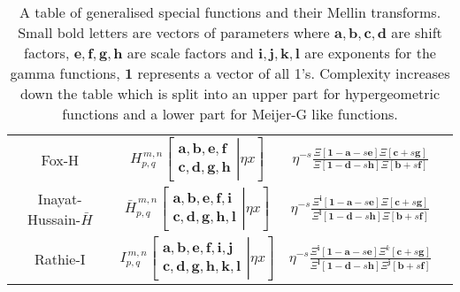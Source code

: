 \documentclass[journal=jcisd8,manuscript=article,layout=onecolumn,pdftex,floatfix,amsmath,amssymb,10pt]{achemso}
\begin{document}
\begin{table}
\begin{tabular}{|c|c|c|c|}
Fox-H & $H_{p,q}^{\,m,n} \!\left[\left. \begin{matrix}
\mathbf{a},\mathbf{b},\mathbf{e,f} \\
\mathbf{c},\mathbf{d},\mathbf{g,h} \end{matrix} \right| \eta x \right]$ & $\eta^{-s}\frac{\Xi[\mathbf{1-a}-s\mathbf{e}]\Xi[\mathbf{c}+s\mathbf{g}]}{\Xi[\mathbf{1-d}-s\mathbf{h}] \Xi[\mathbf{b} + s \mathbf{f}]}$ & \citep{Fox1961,Rathie2017}\\
Inayat-Hussain-$\bar{H}$  & $\bar{H}_{p,q}^{\,m,n} \!\left[\left. \begin{matrix}
\mathbf{a},\mathbf{b},\mathbf{e,f,i} \\
\mathbf{c},\mathbf{d},\mathbf{g,h,l} \end{matrix} \right| \eta x \right]$ & $\eta^{-s}\frac{\Xi^{\mathbf{i}}[\mathbf{1-a}-s\mathbf{e}]\Xi[\mathbf{c}+s\mathbf{g}]}{\Xi^{\mathbf{l}}[\mathbf{1-d}-s\mathbf{h}] \Xi[\mathbf{b} + s \mathbf{f}]}$ & \citep{InayatHussain}\\
Rathie-I & $I_{p,q}^{\,m,n} \!\left[\left. \begin{matrix}
\mathbf{a},\mathbf{b},\mathbf{e,f,i,j} \\
\mathbf{c},\mathbf{d},\mathbf{g,h,k,l} \end{matrix} \right| \eta x \right]$ & $\eta^{-s}\frac{\Xi^{\mathbf{i}}[\mathbf{1-a}-s\mathbf{e}]\Xi^{k}[\mathbf{c}+s\mathbf{g}]}{\Xi^{\mathbf{l}}[\mathbf{1-d}-s\mathbf{h}] \Xi^{\mathbf{j}}[\mathbf{b} + s \mathbf{f}]}$ & \citep{Rathie1997}\\
\hline
\end{tabular}
\caption{A table of generalised special functions and their Mellin transforms. Small bold letters are vectors of parameters where $\mathbf{a,b,c,d}$ are shift factors, $\mathbf{e,f,g,h}$ are scale factors and $\mathbf{i,j,k,l}$ are exponents for the gamma functions, $\mathbf{1}$ represents a vector of all 1's. Complexity increases down the table which is split into an upper part for hypergeometric functions and a lower part for Meijer-G like functions.}
\end{table}
\end{document}
